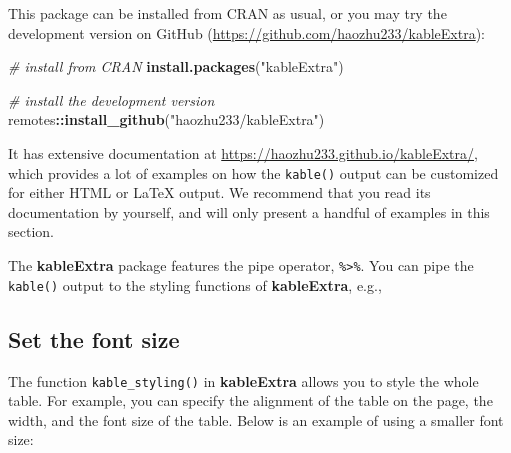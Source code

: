 \documentclass[
  11pt,
]{krantz}
\newenvironment{Shaded}{\begin{snugshade}}{\end{snugshade}}
\newcommand{\CommentTok}[1]{\textcolor[rgb]{0.37,0.37,0.37}{\textit{#1}}}
\newcommand{\DataTypeTok}[1]{\textcolor[rgb]{0.27,0.27,0.27}{#1}}
\newcommand{\DecValTok}[1]{\textcolor[rgb]{0.06,0.06,0.06}{#1}}
\newcommand{\KeywordTok}[1]{\textcolor[rgb]{0.27,0.27,0.27}{\textbf{#1}}}
\newcommand{\NormalTok}[1]{#1}
\newcommand{\OperatorTok}[1]{\textcolor[rgb]{0.43,0.43,0.43}{\textbf{#1}}}
\newcommand{\OtherTok}[1]{\textcolor[rgb]{0.37,0.37,0.37}{#1}}
\newcommand{\StringTok}[1]{\textcolor[rgb]{0.5,0.5,0.5}{#1}}
\begin{document}
This package can be installed from CRAN as usual, or you may try the development version on GitHub (\url{https://github.com/haozhu233/kableExtra}):

\begin{Shaded}
\begin{Highlighting}[]
\CommentTok{# install from CRAN}
\KeywordTok{install.packages}\NormalTok{(}\StringTok{"kableExtra"}\NormalTok{)}

\CommentTok{# install the development version}
\NormalTok{remotes}\OperatorTok{::}\KeywordTok{install_github}\NormalTok{(}\StringTok{"haozhu233/kableExtra"}\NormalTok{)}
\end{Highlighting}
\end{Shaded}

It has extensive documentation at \url{https://haozhu233.github.io/kableExtra/}, which provides a lot of examples on how the \texttt{kable()} output can be customized for either HTML or LaTeX output. We recommend that you read its documentation by yourself, and will only present a handful of examples in this section.

The \textbf{kableExtra} package features the pipe operator, \texttt{\%\textgreater{}\%}. You can pipe the \texttt{kable()} output to the styling functions of \textbf{kableExtra}, e.g.,

\begin{Shaded}
\end{Shaded}

\hypertarget{set-the-font-size}{%
\subsection{Set the font size}\label{set-the-font-size}}

The function \texttt{kable\_styling()} in \textbf{kableExtra} allows you to style the whole table. For example, you can specify the alignment of the table on the page, the width, and the font size of the table. Below is an example of using a smaller font size:

\begin{Shaded}
\end{Shaded}
\end{document}

